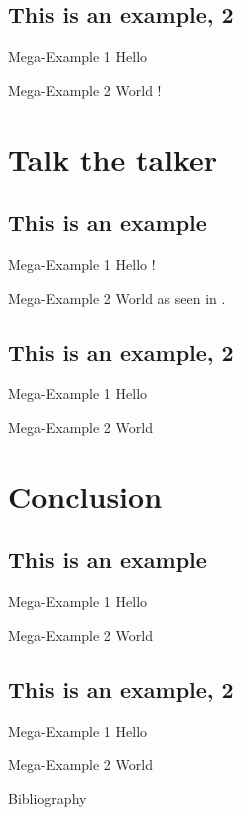 \documentclass[aspectratio=169,usepdftitle=true]{beamer}
\begin{document}
\subsection{This is an example, 2}

\begin{frame}{Mega-Example 1}
    Hello
\end{frame}

\begin{frame}{Mega-Example 2}
    World \cite{knuth-web}!
\end{frame}

\section{Talk the talker}
\subsection{This is an example}

\begin{frame}{Mega-Example 1}
    Hello \cite{dirac}!
\end{frame}

\begin{frame}{Mega-Example 2}
    World as seen in \cite{einstein}.
\end{frame}

\subsection{This is an example, 2}

\begin{frame}{Mega-Example 1}
    Hello
\end{frame}

\begin{frame}{Mega-Example 2}
    World
\end{frame}


\section{Conclusion}
\subsection{This is an example}

\begin{frame}{Mega-Example 1}
    Hello
\end{frame}

\begin{frame}{Mega-Example 2}
    World
\end{frame}

\subsection{This is an example, 2}

\begin{frame}{Mega-Example 1}
    Hello
\end{frame}

\begin{frame}{Mega-Example 2}
    World
\end{frame}

\begin{frame}{Bibliography}
    \printbibliography
\end{frame}
\end{document}
